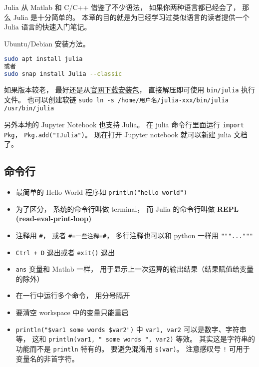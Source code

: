 
\begin{issues}
\issueDraft
\end{issues}

Julia 从 Matlab 和 C/C++ 借鉴了不少语法， 如果你两种语言都已经会了， 那么 Julia 是十分简单的。 本章的目的就是为已经学习过类似语言的读者提供一个 Julia 语言的快速入门笔记。

Ubuntu/Debian 安装方法。
\begin{lstlisting}[language=bash]
sudo apt install julia
或者
sudo snap install Julia --classic
\end{lstlisting}
如果版本较老， 最好还是从\href{https://julialang.org/downloads}{官网下载安装包}， 直接解压即可使用 \verb|bin/julia| 执行文件。 也可以创建软链 \verb|sudo ln -s /home/用户名/julia-xxx/bin/julia /usr/bin/julia|

另外本地的 Jupyter Notebook 也支持 Julia。 在 julia 命令行里面运行 \verb|import Pkg|， \verb|Pkg.add("IJulia")|。 现在打开 Jupyter notebook 就可以新建 julia 文档了。

\subsection{命令行}
\begin{itemize}
\item 最简单的 Hello World 程序如 \verb|println("hello world")|

\item 为了区分， 系统的命令行叫做 terminal， 而 Julia 的命令行叫做 \textbf{REPL (read-eval-print-loop)}
\item 注释用 \verb|#|， 或者 \verb|#=一些注释=#|， 多行注释也可以和 python 一样用 \verb|"""..."""|
\item \verb|Ctrl + D| 退出或者 \verb|exit()| 退出
\item \verb|ans| 变量和 Matlab 一样， 用于显示上一次运算的输出结果（结果赋值给变量的除外）
\item 在一行中运行多个命令， 用分号隔开
\item 要清空 workspace 中的变量只能重启
\item \verb|println("$var1 some words $var2")| 中 \verb|var1, var2| 可以是数字、字符串等， 这和 \verb|println(var1, " some words ", var2)| 等效。 其实这是字符串的功能而不是 \verb|println| 特有的。 要避免混淆用 \verb|$(var)|。 注意感叹号 \verb|!| 可用于变量名的非首字符。
\end{itemize}

